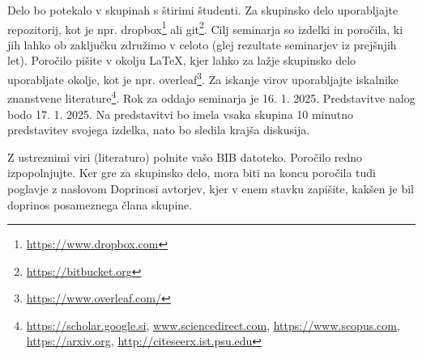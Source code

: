 Delo bo potekalo v skupinah s štirimi študenti. Za skupinsko delo uporabljajte repozitorij, kot je npr. dropbox\footnote{\url{https://www.dropbox.com}} ali git\footnote{\url{https://bitbucket.org}}. Cilj seminarja so izdelki in poročila, ki jih lahko ob zaključku združimo v celoto (glej rezultate seminarjev iz prejšnjih let). Poročilo pišite v okolju LaTeX, kjer lahko za lažje skupinsko delo uporabljate okolje, kot je npr. overleaf\footnote{\url{https://www.overleaf.com/}}. Za iskanje virov uporabljajte iskalnike znanstvene literature\footnote{\url{https://scholar.google.si}, \url{www.sciencedirect.com}, \url{https://www.scopus.com}, \url{https://arxiv.org}, \url{http://citeseerx.ist.psu.edu}}. Rok za oddajo seminarja je 16. 1. 2025. Predstavitve nalog bodo 17. 1. 2025. Na predstavitvi bo imela vsaka skupina 10 minutno predstavitev svojega izdelka, nato bo sledila krajša diskusija.

Z ustreznimi viri (literaturo) polnite vašo BIB datoteko. Poročilo redno izpopolnjujte. Ker gre za skupinsko delo, mora biti na koncu poročila tudi poglavje z naslovom Doprinosi avtorjev, kjer v enem stavku zapišite, kakšen je bil doprinos posameznega člana skupine.


